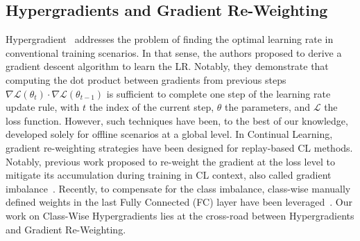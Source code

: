 \subsection{Hypergradients and Gradient Re-Weighting}
Hypergradient~\cite{baydin2018hypergradient, almeida1999parameter} addresses the problem of finding the optimal learning rate in conventional training scenarios. In that sense, the authors proposed to derive a gradient descent algorithm to learn the LR. Notably, they demonstrate that computing the dot product between gradients from previous steps $\nabla\mathcal{L}(\theta_t) \cdot \nabla\mathcal{L}(\theta_{t-1})$ is sufficient to complete one step of the learning rate update rule, with $t$ the index of the current step, $\theta$ the parameters, and $\mathcal{L}$ the loss function. However, such techniques have been, to the best of our knowledge, developed solely for offline scenarios at a global level. In Continual Learning, gradient re-weighting strategies have been designed for replay-based CL methods. Notably, previous work proposed to re-weight the gradient at the loss level to mitigate its accumulation during training in CL context, also called gradient imbalance~\cite{guo_dealing_2023}. Recently, to compensate for the class imbalance, class-wise manually defined weights in the last Fully Connected (FC) layer have been leveraged~\cite{he2024gradient}. Our work on Class-Wise Hypergradients lies at the cross-road between Hypergradients and Gradient Re-Weighting.


